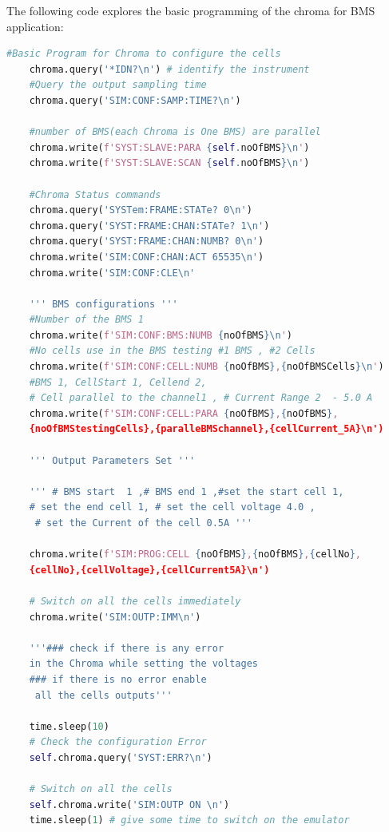 The following code explores the basic programming of the chroma for BMS application:

\begin{lstlisting}[language=Python, caption=Basic BMS Program for Chroma]
    #Basic Program for Chroma to configure the cells
    chroma.query('*IDN?\n') # identify the instrument
    #Query the output sampling time
    chroma.query('SIM:CONF:SAMP:TIME?\n') 

    #number of BMS(each Chroma is One BMS) are parallel
    chroma.write(f'SYST:SLAVE:PARA {self.noOfBMS}\n')
    chroma.write(f'SYST:SLAVE:SCAN {self.noOfBMS}\n')

    #Chroma Status commands
    chroma.query('SYSTem:FRAME:STATe? 0\n')
    chroma.query('SYST:FRAME:CHAN:STATe? 1\n')
    chroma.query('SYST:FRAME:CHAN:NUMB? 0\n')
    chroma.write('SIM:CONF:CHAN:ACT 65535\n')
    chroma.write('SIM:CONF:CLE\n'

    ''' BMS configurations '''
    #Number of the BMS 1
    chroma.write(f'SIM:CONF:BMS:NUMB {noOfBMS}\n')
    #No cells use in the BMS testing #1 BMS , #2 Cells 
    chroma.write(f'SIM:CONF:CELL:NUMB {noOfBMS},{noOfBMSCells}\n')
    #BMS 1, CellStart 1, Cellend 2, 
    # Cell parallel to the channel1 , # Current Range 2  - 5.0 A
    chroma.write(f'SIM:CONF:CELL:PARA {noOfBMS},{noOfBMS},
    {noOfBMStestingCells},{paralleBMSchannel},{cellCurrent_5A}\n') 

    ''' Output Parameters Set '''

    ''' # BMS start  1 ,# BMS end 1 ,#set the start cell 1, 
    # set the end cell 1, # set the cell voltage 4.0 ,
     # set the Current of the cell 0.5A '''

    chroma.write(f'SIM:PROG:CELL {noOfBMS},{noOfBMS},{cellNo},
    {cellNo},{cellVoltage},{cellCurrent5A}\n') 

    # Switch on all the cells immediately
    chroma.write('SIM:OUTP:IMM\n') 

    '''### check if there is any error 
    in the Chroma while setting the voltages 
    ### if there is no error enable
     all the cells outputs''' 

    time.sleep(10)
    # Check the configuration Error 
    self.chroma.query('SYST:ERR?\n')

    # Switch on all the cells
    self.chroma.write('SIM:OUTP ON \n')  
    time.sleep(1) # give some time to switch on the emulator 

\end{lstlisting}

